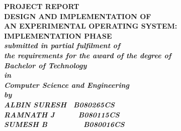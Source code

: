 \pagestyle{empty}

\begin{center}%
	\large\bf{PROJECT REPORT}\\%
	\vspace{1cm}%
	\Large\bf{DESIGN AND IMPLEMENTATION OF \\ AN EXPERIMENTAL OPERATING SYSTEM:\\ IMPLEMENTATION PHASE}\\%
	\vspace{1cm}%
	\small\it{submitted in partial fulfilment of}\\%
	\small\it{the requirements for the award of the degree of}\\%
	\vspace{0.5cm}%
	\large\bf\it{Bachelor of Technology}\\%
	\small\it{in}\\%
	\large\it{Computer Science and Engineering}\\%
	\vspace{0.5cm}%
	\Large\it {by}\\%
	\vspace{0.3cm}%
	\large\bf{\uppercase{albin suresh \ b080265cs}}\\%
	\large\bf{\uppercase{ramnath j \ \ \ \ \ b080115cs}}\\%
	\large\bf{\uppercase{sumesh b \ \ \ \ \ \ \ \ b080016cs}}\\%


\end{center}
